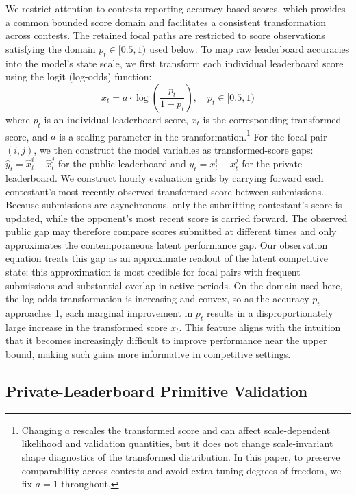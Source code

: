 \documentclass[mnsc]{informs3}
\begin{document}
We restrict attention to contests reporting accuracy-based scores, which provides a common bounded score domain and facilitates a consistent transformation across contests.
The retained focal paths are restricted to score observations satisfying the domain $p_t\in[0.5,1)$ used below.
To map raw leaderboard accuracies into the model's state scale, we first transform each individual leaderboard score using the logit (log-odds) function:
\begin{equation}\label{eq-leaderboard-transform}
x_t = a \cdot \log\left(\frac{p_t}{1-p_t}\right), \quad p_t\in[0.5,1)
\end{equation}
where $p_t$ is an individual leaderboard score, $x_t$ is the corresponding transformed score, and $a$ is a scaling parameter in the transformation.\footnote{
Changing $a$ rescales the transformed score and can affect scale-dependent likelihood and validation quantities, but it does not change scale-invariant shape diagnostics of the transformed distribution.
In this paper, to preserve comparability across contests and avoid extra tuning degrees of freedom, we fix $a=1$ throughout.
}
For the focal pair $(i,j)$, we then construct the model variables as transformed-score gaps: $\hat y_t=\hat x_t^i-\hat x_t^j$ for the public leaderboard and $y_t=x_t^i-x_t^j$ for the private leaderboard.
We construct hourly evaluation grids by carrying forward each contestant's most recently observed transformed score between submissions.
Because submissions are asynchronous, only the submitting contestant’s score is updated, while the opponent’s most recent score is carried forward. 
The observed public gap may therefore compare scores submitted at different times and only approximates the contemporaneous latent performance gap.
Our observation equation treats this gap as an approximate readout of the latent competitive state; this approximation is most credible for focal pairs with frequent submissions and substantial overlap in active periods.
On the domain used here, the log-odds transformation is increasing and convex, so as the accuracy $p_t$ approaches 1, each marginal improvement in $p_t$ results in a disproportionately large increase in the transformed score $x_t$.
This feature aligns with the intuition that it becomes increasingly difficult to improve performance near the upper bound, making such gains more informative in competitive settings.


\subsection{Private-Leaderboard Primitive Validation}\label{sect-validation}
\end{document}
